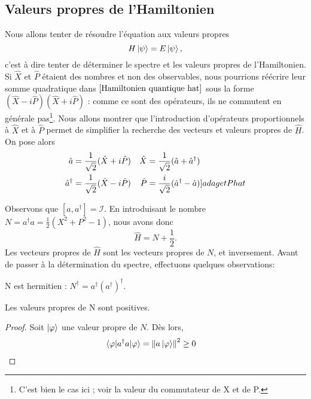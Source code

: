 \documentclass[../Notesdecours.tex]{subfiles}
\begin{document}
\subsection{Valeurs propres de l'Hamiltonien}
Nous allons tenter de résoudre l'équation aux valeurs propres 
\begin{equation}
    H\ket{\psi} = E\ket{\psi},
\end{equation}
c'est à dire tenter de déterminer le spectre et les valeurs propres de l'Hamiltonien.\\

Si $\hat{X}$ et $\hat{P}$ étaient des nombres et non des observables, nous pourrions réécrire leur somme quadratique dans $\eqref{Hamiltonien quantique hat}$ sous la forme $(\hat{X}-i\hat{P})(\hat{X}+i\hat{P})$ : comme ce sont des opérateurs, ils ne commutent en générale pas\footnote{C'est bien le cas ici ; voir la valeur du commutateur de X et de P.}. Nous allons montrer que l'introduction d'opérateurs proportionnels à $\hat{X}$ et à $\hat{P}$ permet de simplifier la recherche des vecteurs et valeurs propres de $\hat{H}$. On pose alors
\begin{align}
    \hat{a} &= \frac{1}{\sqrt{2}}(\hat{X}+i\hat{P})   & \hat{X} &= \frac{1}{\sqrt{2}}(\hat{a}+\hat{a}^\dagger)\label{a et X hat}\\
    \hat{a}^\dagger &= \frac{1}{\sqrt{2}}(\hat{X}-i\hat{P})    & \hat{P} &= \frac{i}{\sqrt{2}}(\hat{a}^\dagger-\hat{a}) \label[]{a dag et P hat}
\end{align}

Observons que $[a,a^\dagger] = \mathcal{I}$. En introduisant le nombre $N = a^\dagger a = \frac{1}{2}\left(X^2+P^2-1\right)$, nous avons donc
\begin{equation}
    \hat{H} = N+\frac{1}{2}.
\end{equation}
Les vecteurs propres de $\hat{H}$ sont les vecteurs propres de $N$, et inversement. Avant de passer à la détermination du spectre, effectuons quelques observations:
\begin{Property}
    N est hermitien : $N^\dagger = a^\dagger \left(a^\dagger\right)^\dagger$.
\end{Property}
\begin{Property}
    \label{N positif}
    Les valeurs propres de N sont positives.
\end{Property}
\begin{proof}
    Soit $\ket{\varphi}$ une valeur propre de $N$. Dès lors,
    \begin{align*}
        \braket{\varphi|a^\dagger a|\varphi} &= \norm{a\ket{\varphi}}^2 \geq 0
    \end{align*}
\end{proof}
\end{document}
